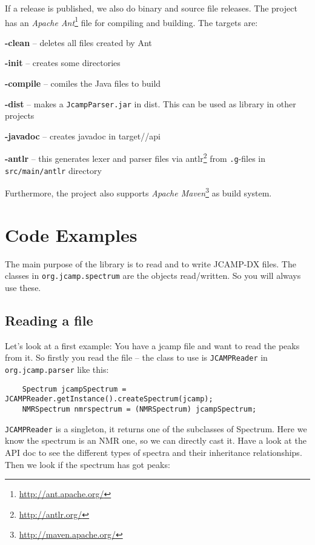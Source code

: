 \documentclass[a4paper]{book}
\begin{document}
If a release is published, we also do binary and source file releases. The
project has an \textit{Apache Ant}\footnote{\url{http://ant.apache.org/}{}} file
for compiling and building. The targets are:
\begin{tight_itemize}
  \item \textbf{-clean} -- deletes all files created by Ant
  \item \textbf{-init} -- creates some directories
  \item \textbf{-compile} -- comiles the Java files to build
  \item \textbf{-dist} -- makes a \texttt{JcampParser.jar} in dist. This can be used as 
  library in other projects
  \item \textbf{-javadoc} -- creates javadoc in target//api
  \item \textbf{-antlr} -- this generates lexer and parser files via 
  antlr\footnote{\url{http://antlr.org/}{}}  from \texttt{.g}-files 
  in \texttt{src/main/antlr} directory
\end{tight_itemize}
Furthermore, the project also supports \textit{Apache Maven}\footnote{\url{http://maven.apache.org/}{}} 
as build system.

\chapter{Code Examples}

The main purpose of the library is to read and to write JCAMP-DX files. The
classes in \texttt{org.jcamp.spectrum} are the objects read/written. So you will
always use these.

\section{Reading a file}

Let's look at a first example: You have a jcamp file and want to read the peaks
from it. So firstly you read the file –  the class to use is
\texttt{JCAMPReader} in \texttt{org.jcamp.parser} like this:

\begin{verbatim}
    Spectrum jcampSpectrum = JCAMPReader.getInstance().createSpectrum(jcamp);
    NMRSpectrum nmrspectrum = (NMRSpectrum) jcampSpectrum;
\end{verbatim}

\texttt{JCAMPReader} is a singleton, it returns one of the subclasses of
Spectrum. Here we know the spectrum is an NMR one, so we can directly cast it.
Have a look at the API doc to see the different types of spectra and their
inheritance relationships. Then we look if the spectrum has got peaks:
\end{document}
